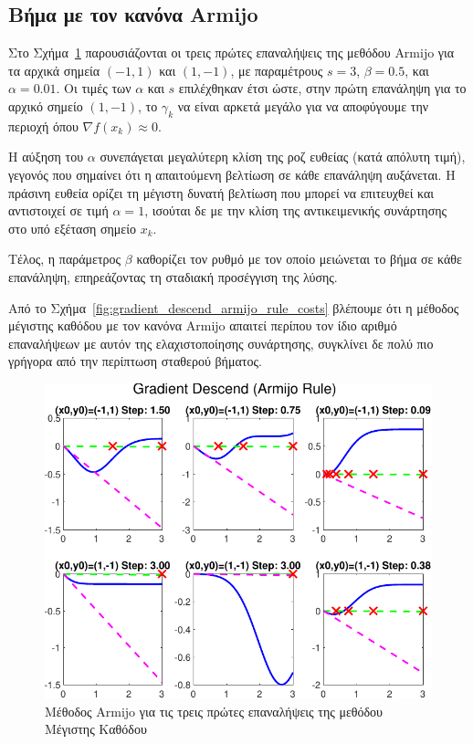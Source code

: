 \documentclass[a4paper,12pt]{article}
\begin{document}
\subsection*{Βήμα με τον κανόνα  Armijo}
Στο Σχήμα~\ref{fig:gradient_descend_armijo_rule_iters} παρουσιάζονται οι τρεις πρώτες επαναλήψεις της μεθόδου
Armijo για τα αρχικά σημεία $(-1, 1)$ και $(1, -1)$,
με παραμέτρους $s = 3$, $\beta = 0.5$, και $\alpha = 0.01$. Οι τιμές των $\alpha$ και $s$ επιλέχθηκαν έτσι ώστε, 
στην πρώτη επανάληψη για το αρχικό σημείο $(1, -1)$, το $\gamma_k$ να είναι αρκετά μεγάλο για να αποφύγουμε την 
περιοχή όπου $\nabla f(x_k) \approx 0$.

Η αύξηση του $\alpha$ συνεπάγεται μεγαλύτερη κλίση της ροζ ευθείας (κατά απόλυτη τιμή), γεγονός που σημαίνει ότι η 
απαιτούμενη βελτίωση σε κάθε επανάληψη αυξάνεται. Η πράσινη ευθεία ορίζει τη μέγιστη δυνατή βελτίωση που μπορεί να 
επιτευχθεί και αντιστοιχεί σε τιμή $\alpha = 1$, ισούται δε με την κλίση της αντικειμενικής συνάρτησης στο υπό εξέταση
σημείο $x_k$.

Τέλος, η παράμετρος $\beta$ καθορίζει τον ρυθμό με τον οποίο μειώνεται το βήμα σε κάθε επανάληψη, επηρεάζοντας τη 
σταδιακή προσέγγιση της λύσης.

Από το Σχήμα~\ref{fig:gradient_descend_armijo_rule_costs} βλέπουμε ότι η μέθοδος μέγιστης καθόδου
με τον κανόνα Armijo  απαιτεί περίπου τον ίδιο αριθμό επαναλήψεων
με αυτόν της ελαχιστοποίησης συνάρτησης, συγκλίνει δε πολύ πιο γρήγορα από την περίπτωση σταθερού βήματος.


\begin{figure}
    \centering
    \includegraphics[width=1\linewidth]{plot/gradient_descend_armijo_rule_iters.pdf}
    \caption{Μέθοδος  Armijo  για τις τρεις πρώτες επαναλήψεις της μεθόδου Μέγιστης Καθόδου}
    \label{fig:gradient_descend_armijo_rule_iters}
\end{figure}
\end{document}
